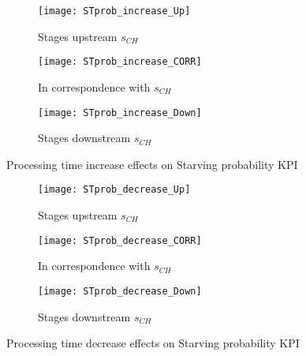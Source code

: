 \begin{landscape}
\begin{figure}[p]
  \centering
  \begin{subfigure}[t]{0.4\textwidth}
    \texttt{[image: STprob\_increase\_Up]}
    \caption{Stages upstream $s_{CH}$}
    \label{fig:Processing time increase effects on Starving probability KPI - Stages upstream}   
  \end{subfigure}
  \begin{subfigure}[t]{0.4\textwidth}
    \texttt{[image: STprob\_increase\_CORR]}
    \caption{In correspondence with $s_{CH}$}
    \label{fig:Processing time increase effects on Starving probability KPI - In correspondence with}   
  \end{subfigure}
  \begin{subfigure}[t]{0.4\textwidth}
    \texttt{[image: STprob\_increase\_Down]}
    \caption{Stages downstream $s_{CH}$}
    \label{fig:Processing time increase effects on Starving probability KPI - Stages downstream}   
  \end{subfigure}
  \caption{Processing time increase effects on Starving probability KPI}
  \label{fig:Processing time increase effects on Starving probability KPI}
\end{figure}
\begin{figure}[p]
  \centering
  \begin{subfigure}[b]{0.4\textwidth}
    \texttt{[image: STprob\_decrease\_Up]}
    \caption{Stages upstream $s_{CH}$}
    \label{fig:Processing time decrease effects on Starving probability KPI - Stages upstream}   
  \end{subfigure}
  \begin{subfigure}[b]{0.4\textwidth}
    \texttt{[image: STprob\_decrease\_CORR]}
    \caption{In correspondence with $s_{CH}$}
    \label{fig:Processing time decrease effects on Starving probability KPI - In correspondence with}   
  \end{subfigure}
  \begin{subfigure}[b]{0.4\textwidth}
    \texttt{[image: STprob\_decrease\_Down]}
    \caption{Stages downstream $s_{CH}$}
    \label{fig:Processing time decrease effects on Starving probability KPI - Stages downstream}   
  \end{subfigure}
  \caption{Processing time decrease effects on Starving probability KPI}
  \label{fig:Processing time decrease effects on Starving probability KPI}
\end{figure}
\end{landscape}
